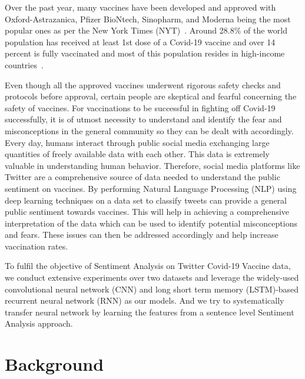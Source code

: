 \documentclass[conference]{IEEEtran}
\begin{document}
Over the past year, many vaccines have been developed and approved with Oxford-Astrazanica, Pfizer BioNtech, Sinopharm, and Moderna being the most popular ones as per the New York Times (NYT)~\cite{fworld}. Around 28.8\% of the world population has received at least 1st dose of a Covid-19 vaccine and over 14 percent is fully vaccinated and most of this population resides in high-income countries~\cite{eworld}. 

Even though all the approved vaccines underwent rigorous safety checks and protocols before approval, certain people are skeptical and fearful concerning the safety of vaccines. For vaccinations to be successful in fighting off Covid-19 successfully, it is of utmost necessity to understand and identify the fear and misconceptions in the general community so they can be dealt with accordingly. Every day, humans interact through public social media exchanging large quantities of freely available data with each other.  This data is extremely valuable in understanding human behavior. Therefore, social media platforms like Twitter are a comprehensive source of data needed to understand the public sentiment on vaccines. By performing Natural Language Processing (NLP) using deep learning techniques on a data set to classify tweets can provide a general public sentiment towards vaccines. This will help in achieving a comprehensive interpretation of the data which can be used to identify potential misconceptions and fears. These issues can then be addressed accordingly and help increase vaccination rates.

To fulfil the objective of Sentiment Analysis on Twitter Covid-19 Vaccine data, we conduct extensive experiments over two datasets and leverage the widely-used convolutional neural network (CNN) and long short term memory (LSTM)-based recurrent neural network (RNN) as
our models. And we try to systematically transfer neural network by learning the features from a sentence level Sentiment Analysis approach. 
\\


\section{Background}\label{sec:background}

\end{document}
